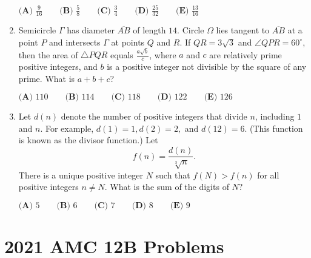 \documentclass{article}
\begin{document}
\begin{enumerate}[label=\arabic*., itemsep=0.5em]
\(\textbf{(A) }\frac{9}{16} \qquad \textbf{(B) }\frac{5}{8} \qquad \textbf{(C) }\frac34 \qquad \textbf{(D) }\frac{25}{32}\qquad \textbf{(E) }\frac{13}{16}\)\par \vspace{0.5em}\item Semicircle \(\Gamma\) has diameter \(\overline{AB}\) of length \(14\). Circle \(\Omega\) lies tangent to \(\overline{AB}\) at a point \(P\) and intersects \(\Gamma\) at points \(Q\) and \(R\). If \(QR=3\sqrt3\) and \(\angle QPR=60^\circ\), then the area of \(\triangle PQR\) equals \(\tfrac{a\sqrt{b}}{c}\), where \(a\) and \(c\) are relatively prime positive integers, and \(b\) is a positive integer not divisible by the square of any prime. What is \(a+b+c\)?

\(\textbf{(A) }110 \qquad \textbf{(B) }114 \qquad \textbf{(C) }118 \qquad \textbf{(D) }122\qquad \textbf{(E) }126\)\par \vspace{0.5em}\item Let \(d(n)\) denote the number of positive integers that divide \(n\), including \(1\) and \(n\). For example, \(d(1)=1,d(2)=2,\) and \(d(12)=6\). (This function is known as the divisor function.) Let
\begin{equation*}
f(n)=\frac{d(n)}{\sqrt [3]n}.
\end{equation*}
There is a unique positive integer \(N\) such that \(f(N)>f(n)\) for all positive integers \(n\ne N\). What is the sum of the digits of \(N?\)

\(\textbf{(A) }5 \qquad \textbf{(B) }6 \qquad \textbf{(C) }7 \qquad \textbf{(D) }8\qquad \textbf{(E) }9\)\par \vspace{0.5em}
\end{enumerate}
\newpage\section*{2021 AMC 12B Problems}
\end{document}
